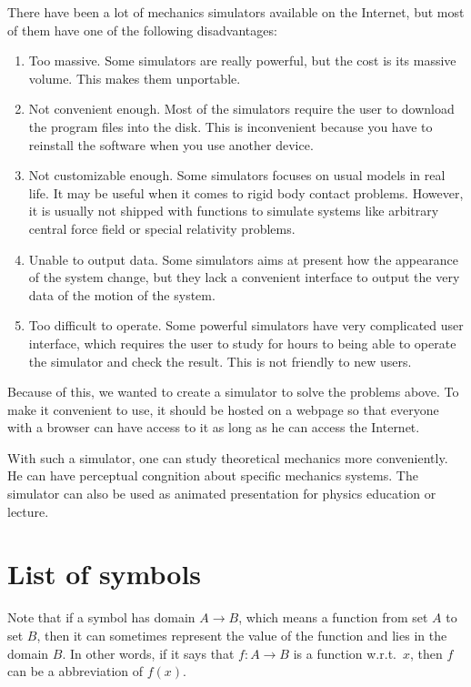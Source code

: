 \documentclass[12pt]{article}
\begin{document}
There have been a lot of mechanics simulators available on the Internet,
but most of them have one of the following disadvantages:
\begin{enumerate}
  \item Too massive.
  Some simulators are really powerful, but the cost is its massive volume.
  This makes them unportable.

  \item Not convenient enough.
  Most of the simulators require the user to download the program files into the disk.
  This is inconvenient because you have to reinstall the software when you use another device.

  \item Not customizable enough.
  Some simulators focuses on usual models in real life.
  It may be useful when it comes to rigid body contact problems.
  However, it is usually not shipped with functions to simulate systems like arbitrary central force field or special relativity problems.

  \item Unable to output data.
  Some simulators aims at present how the appearance of the system change,
  but they lack a convenient interface to output the very data of the motion of the system.

  \item Too difficult to operate.
  Some powerful simulators have very complicated user interface,
  which requires the user to study for hours to being able to operate the simulator and check the result.
  This is not friendly to new users.
\end{enumerate}

Because of this, we wanted to create a simulator to solve the problems above.
To make it convenient to use, it should be hosted on a webpage
so that everyone with a browser can have access to it as long as he can access the Internet.

With such a simulator, one can study theoretical mechanics more conveniently.
He can have perceptual congnition about specific mechanics systems.
The simulator can also be used as animated presentation for physics education or lecture.

\section{List of symbols}

Note that if a symbol has domain $A\rightarrow B$,
which means a function from set $A$ to set $B$,
then it can sometimes represent the value of the function
and lies in the domain $B$.
In other words, if it says that $f:A\rightarrow B$ is a function w.r.t.\ $x$,
then $f$ can be a abbreviation of $f\!\left(x\right)$.
\end{document}
